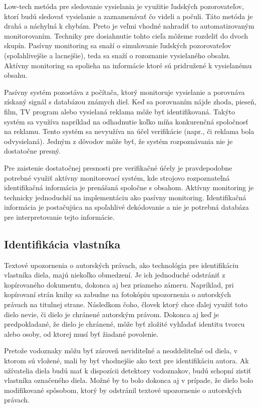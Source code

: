 Low-tech metóda pre sledovanie vysielania je využitie ľudských pozorovateľov, ktorí budú sledovať vysielanie a zaznamenávať čo videli a počuli. Táto metóda je drahá a náchylná k chybám. Preto je veľmi vhodné nahradiť to automatizovaným monitorovaním. Techniky pre dosiahnutie tohto cieľa môžeme rozdeliť do dvoch skupín. Pasívny monitoring sa snaží o simulovanie ľudských pozorovateľov (spoľahlivejšie a lacnejšie), teda sa snaží o rozoznanie vysielaného obsahu. Aktívny monitoring sa spolieha na informácie ktoré sú pridružené k vysielanému obsahu.

Pasívny systém pozostáva z počítača, ktorý monitoruje vysielanie a porovnáva získaný signál s databázou známych  diel. Keď sa porovnaním nájde zhoda, pieseň, film, TV program alebo vysielaná reklama môže byť identifikovaná. Takýto systém sa využíva napríklad na odhadnutie koľko míňa konkurenčná spoločnosť na reklamu. Tento systém sa nevyužíva na účel verifikácie (napr., či reklama bola odvysielaná). Jedným z dôvodov môže byť, že systém rozpoznávania nie je dostatočne presný.

Pre zaistenie dostatočnej presnosti pre verifikačné účely je pravdepodobne potrebné využiť aktívny monitorovací systém, kde strojovo rozpoznateľná identifikačná informácia je prenášaná spoločne s obsahom. Aktívny monitoring je technicky jednoduchší na implementáciu ako pasívny monitoring. Identifikačná informácia je postačujúca na spoľahlivé dekódovanie a nie je potrebná databáza pre interpretovanie tejto informácie. \cite{Cox}

\subsection{Identifikácia vlastníka}
Textové upozornenia o autorských právach, ako technológia pre identifikáciu vlastníka diela, majú niekoľko obmedzení. Je ich jednoduché odstrániť z kopírovaného dokumentu, dokonca aj bez priameho zámeru. Napríklad, pri kopírovaní strán knihy sa zabudne na fotokópiu upozornenia o autorských právach na titulnej strane. Následkom čoho, človek ktorý chce ďalej využiť toto dielo nevie, či dielo je chránené autorským právom. Dokonca aj keď je predpokladané, že dielo je chránené, môže byť zložité vyhľadať identitu tvorcu alebo osoby, od ktorej musí byť žiadané povolenie.

Pretože vodoznaky môžu byť zároveň neviditeľné a neoddeliteľné od diela, v ktorom sú vložené, mali by byť vhodnejšie ako text pre identifikáciu autora. Ak užívatelia diela budú mať k dispozícii detektory vodoznakov, budú schopní zistiť vlastníka označeného diela. Možné by to bolo dokonca aj v prípade, že dielo bolo modifikované spôsobom, ktorý by odstránil textové upozornenie o autorských právach.

